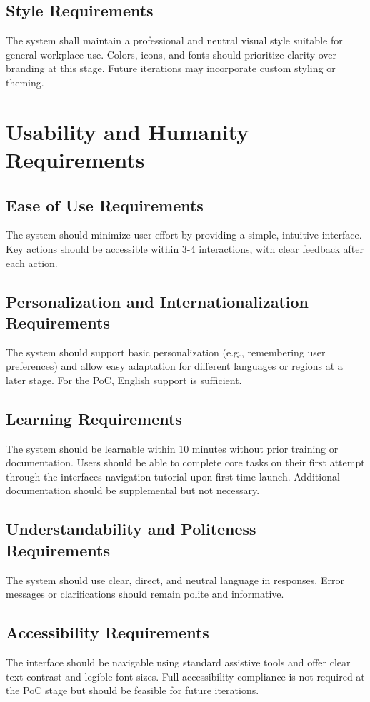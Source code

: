 \documentclass[11pt]{article}
\begin{document}
\subsection{Style Requirements}
The system shall maintain a professional and neutral visual style suitable for general workplace use. Colors, icons, and fonts should prioritize clarity over branding at this stage. Future iterations may incorporate custom styling or theming.


\section{Usability and Humanity Requirements}
\subsection{Ease of Use Requirements}
The system should minimize user effort by providing a simple, intuitive interface. Key actions should be accessible within 3-4 interactions, with clear feedback after each action.
\subsection{Personalization and Internationalization Requirements}
The system should support basic personalization (e.g., remembering user preferences) and allow easy adaptation for different languages or regions at a later stage. For the PoC, English support is sufficient.
\subsection{Learning Requirements}
The system should be learnable within 10 minutes without prior training or documentation. Users should be able to complete core tasks on their first attempt through the interfaces navigation tutorial upon first time launch. Additional documentation should be supplemental but not necessary. 
\subsection{Understandability and Politeness Requirements}
The system should use clear, direct, and neutral language in responses. Error messages or clarifications should remain polite and informative.
\subsection{Accessibility Requirements}
The interface should be navigable using standard assistive tools and offer clear text contrast and legible font sizes. Full accessibility compliance is not required at the PoC stage but should be feasible for future iterations.
\end{document}
